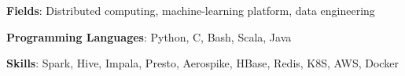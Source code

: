 

\begin{cventries}
    \cvsimpleentry
        { %
            \begin{cvitems}
                \item{
                    {\bf Fields}: Distributed computing, machine-learning platform, data engineering \nn
                }
                \item{
                    {\bf Programming Languages}: Python, C, Bash, Scala, Java \nn
                }
                \item{
                    {\bf Skills}: Spark, Hive, Impala, Presto, Aerospike, HBase, Redis, K8S, AWS, Docker \nn
                }
            \end{cvitems}
        }
\end{cventries}
